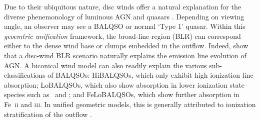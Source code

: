 \documentclass[useAMS,usenatbib]{mn2e_x}
\begin{document}
Due to their ubiquitous nature,
disc winds offer a natural explanation for the
diverse phenemonology of luminous AGN and quasars \citep[e.g.][]{MCGV95, elvis2000}. 
Depending on viewing angle, an observer 
may see a BALQSO or normal `Type 1' quasar.
Within this {\em geoemtric unification} framework, the broad-line region (BLR) can 
correspond either to the dense wind base or clumps embedded
in the outflow. Indeed, \cite{elitzur2014} show that a disc-wind BLR scenario
naturally explains the emission line evolution of AGN.
A biconical wind model can also readily explain the various sub-classifications of BALQSOs: 
HiBALQSOs, which only exhibit high ionization line absorption; LoBALQSOs, which also show
absorption in lower ionization state species such as \mg\ and \al; and
FeLoBALQSOs, which show further absorption in Fe~\textsc{ii} and \textsc{iii}.
In unified geometric models, this is generally attributed to ionization stratification
of the outflow \citep[e.g.][]{elvis2000}.

\end{document}
